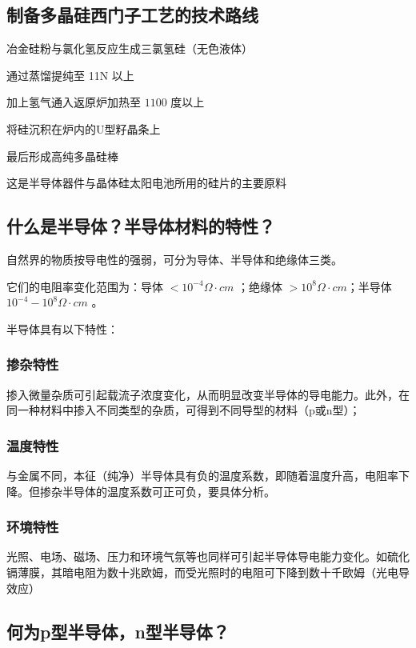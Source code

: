 \documentclass{article}
\begin{document}
\subsection{制备多晶硅西门子工艺的技术路线}

冶金硅粉与氯化氢反应生成三氯氢硅（无色液体）

通过蒸馏提纯至 11N 以上

加上氢气通入返原炉加热至 $1100$ 度以上

将硅沉积在炉内的U型籽晶条上

最后形成高纯多晶硅棒

这是半导体器件与晶体硅太阳电池所用的硅片的主要原料

\subsection{什么是半导体？半导体材料的特性？}

自然界的物质按导电性的强弱，可分为导体、半导体和绝缘体三类。

它们的电阻率变化范围为：导体 $< 10^{-4} \Omega \cdot cm$ ；绝缘体 $> 10^8 \Omega \cdot cm$；半导体 $10^{-4}-10^8 \Omega \cdot cm$ 。

半导体具有以下特性：

\subsubsection{掺杂特性}

掺入微量杂质可引起载流子浓度变化，从而明显改变半导体的导电能力。此外，在同一种材料中掺入不同类型的杂质，可得到不同导型的材料（p或n型）；

\subsubsection{温度特性}

与金属不同，本征（纯净）半导体具有负的温度系数，即随着温度升高，电阻率下降。但掺杂半导体的温度系数可正可负，要具体分析。

\subsubsection{环境特性}

光照、电场、磁场、压力和环境气氛等也同样可引起半导体导电能力变化。如硫化镉薄膜，其暗电阻为数十兆欧姆，而受光照时的电阻可下降到数十千欧姆（光电导效应）

\subsection{何为p型半导体，n型半导体？}
\end{document}

